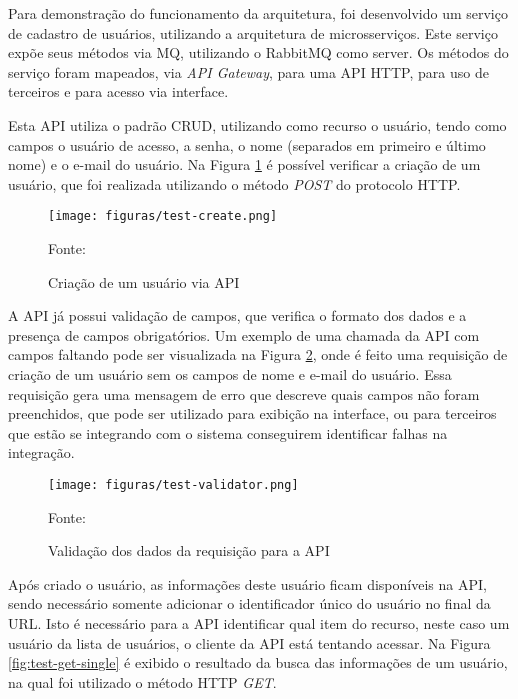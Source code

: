 Para demonstração do funcionamento da arquitetura, foi desenvolvido um
serviço de cadastro de usuários, utilizando a arquitetura de microsserviços.
Este serviço expõe seus métodos via \ac{MQ}, utilizando o RabbitMQ como server.
Os métodos do serviço foram mapeados, via \emph{API Gateway}, para uma
\ac{API} \ac{HTTP}, para uso de terceiros e para acesso via interface.

Esta \ac{API} utiliza o padrão \ac{CRUD}, utilizando como recurso o usuário,
tendo como campos o usuário de acesso, a senha, o nome (separados
em primeiro e último nome) e o e-mail do usuário. Na Figura
\ref{fig:test-create} é possível verificar a criação de um usuário, que
foi realizada utilizando o método \emph{POST} do protocolo \ac{HTTP}.

\begin{figure}[H]
	\centering
	\caption{Criação de um usuário via \ac{API}}
	\texttt{[image: figuras/test-create.png]}

	\label{fig:test-create}
	\footnotesize Fonte: \fonteOAutor
\end{figure}

A \ac{API} já possui validação de campos, que verifica o formato dos dados
e a presença de campos obrigatórios. Um exemplo de uma chamada da \ac{API}
com campos faltando pode ser visualizada na Figura \ref{fig:test-validator},
onde é feito uma requisição de criação de um usuário sem os campos de nome
e e-mail do usuário. Essa requisição gera uma mensagem de erro que descreve
quais campos não foram preenchidos, que pode ser utilizado para exibição
na interface, ou para terceiros que estão se integrando com o sistema
conseguirem identificar falhas na integração.

\begin{figure}[H]
	\centering
	\caption{Validação dos dados da requisição para a \ac{API}}
	\texttt{[image: figuras/test-validator.png]}

	\label{fig:test-validator}
	\footnotesize Fonte: \fonteOAutor
\end{figure}

Após criado o usuário, as informações deste usuário ficam disponíveis na
\ac{API}, sendo necessário somente adicionar o identificador único do usuário
no final da \ac{URL}. Isto é necessário para a \ac{API} identificar qual
item do recurso, neste caso um usuário da lista de usuários, o cliente da
\ac{API} está tentando acessar. Na Figura \ref{fig:test-get-single} é exibido
o resultado da busca das informações de um usuário, na qual foi utilizado o
método \ac{HTTP} \emph{GET}.

